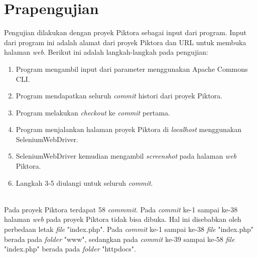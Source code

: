 



\section{Prapengujian}
\label{sec:prapengujian}
Pengujian dilakukan dengan proyek Piktora sebagai input dari program. Input dari program ini adalah alamat dari proyek Piktora dan URL untuk membuka halaman \textit{web}. Berikut ini adalah langkah-langkah pada pengujian:\\
\begin{enumerate}
\item Program mengambil input dari parameter menggunakan Apache Commons CLI.
\item Program mendapatkan seluruh \textit{commit} histori dari proyek Piktora.
\item Program melakukan \textit{checkout} ke \textit{commit} pertama.
\item Program menjalankan halaman proyek Piktora di \textit{localhost} menggunakan SeleniumWebDriver.
\item SeleniumWebDriver kemudian mengambil \textit{screenshot} pada halaman \textit{web} Piktora.
\item Langkah 3-5 diulangi untuk seluruh \textit{commit}.
\end{enumerate}
\ \\
Pada proyek Piktora terdapat 58 \textit{commmit}. Pada \textit{commit} ke-1 sampai ke-38 halaman \textit{web} pada proyek Piktora tidak bisa dibuka. Hal ini disebabkan oleh perbedaan letak \textit{file} "index.php". Pada \textit{commit} ke-1 sampai ke-38 \textit{file} "index.php" berada pada \textit{folder} "www", sedangkan pada \textit{commit} ke-39 sampai ke-58 \textit{file} "index.php" berada pada \textit{folder} "httpdocs".

